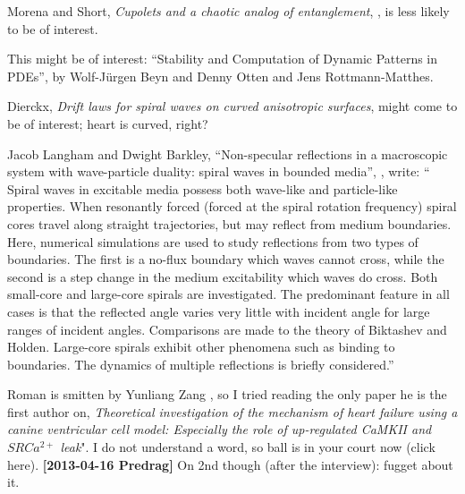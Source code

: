 \begin{description}
Morena and Short, %
{\em Cupolets and a chaotic analog of
entanglement}, , is less likely to be of interest.


\item[2013-02-16 Predrag]
{This} might be of interest: ``Stability and
Computation of Dynamic Patterns in PDEs'', by Wolf-J\"urgen Beyn and
Denny Otten and Jens Rottmann-Matthes.

\item[2013-02-19 Predrag]
Dierckx\etal{},
{\em Drift laws for spiral waves on curved anisotropic surfaces},
 might come to be of interest; heart is curved, right?


\item[2013-04-02 Predrag]
Jacob Langham and Dwight Barkley,
``Non-specular reflections in a macroscopic system with wave-particle
  duality: spiral waves in bounded media'',
, write:
`` Spiral waves in excitable media possess both wave-like and
particle-like properties. When resonantly forced (forced at the
spiral rotation frequency) spiral cores travel along straight
trajectories, but may reflect from medium boundaries. Here, numerical
simulations are used to study reflections from two types of
boundaries. The first is a no-flux boundary which waves cannot cross,
while the second is a step change in the medium excitability which
waves do cross. Both small-core and large-core spirals are
investigated. The predominant feature in all cases is that the
reflected angle varies very little with incident angle for large
ranges of incident angles. Comparisons are made to the theory of
Biktashev and Holden. Large-core spirals exhibit other phenomena such
as binding to boundaries. The dynamics of multiple reflections is
briefly considered.''

\item[2013-04-03 Predrag]
Roman is smitten by Yunliang Zang \etal{}, so I tried reading
the only paper he is the first author on, \emph{Theoretical investigation
of the mechanism of heart failure using a canine ventricular cell model:
{Especially} the role of up-regulated {CaMKII and $SR Ca^{2+}$} leak}".
I do not understand a word, so ball is in your court now
(click
 {here}).
{\bf [2013-04-16 Predrag]} On 2nd though (after the interview): fugget about it.


\end{description}
